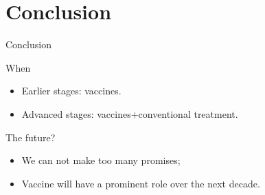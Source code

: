 \documentclass[dvips,11pt,xcolor=dvipsnames]{beamer}
\numberwithin{table}{section}
\numberwithin{figure}{section} %
\begin{document}
\section{Conclusion}


\begin{frame}{Conclusion}
 \begin{block}{When}
    \begin{itemize}
    \item Earlier stages: vaccines.
    \item Advanced stages: vaccines+conventional treatment.
    \end{itemize}
  \end{block}

 \begin{block}{The future?}
    \begin{itemize}
    \item We can not make too many promises;
    \item Vaccine will have a prominent role over the next decade.
    \end{itemize}
  \end{block}

\end{frame}
\end{document}

